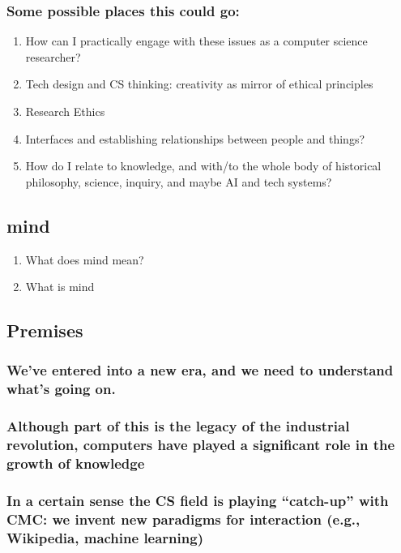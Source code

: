 \documentclass[11pt]{article}
\begin{document}
\subsubsection{Some possible places this could go:}
\label{sec:org56ebe9a}
\begin{enumerate}
\item How can I practically engage with these issues as a computer science researcher?
\label{sec:orgc471b6f}
\item Tech design and CS thinking: creativity as mirror of ethical principles
\label{sec:org09ec082}
\item Research Ethics
\label{sec:org282b2fa}
\item Interfaces and establishing relationships between people and things?
\label{sec:orgbc927ef}
\item How do I relate to knowledge, and with/to the whole body of historical philosophy, science, inquiry, and maybe AI and tech systems?
\label{sec:orgf91d822}
\end{enumerate}
\subsection{mind}
\label{sec:orge4b262a}

\begin{enumerate}
\item What does mind mean?
\label{sec:org4c9b9ca}
\item What is mind
\label{sec:org8d5cc07}
\end{enumerate}
\subsection{Premises}
\label{sec:org84f8193}

\subsubsection{We’ve entered into a new era, and we need to understand what’s going on.}
\label{sec:org0c9e273}
\subsubsection{Although part of this is the legacy of the industrial revolution, computers have played a significant role in the growth of knowledge}
\label{sec:org844a366}
\subsubsection{In a certain sense the CS field is playing “catch-up” with CMC: we invent new paradigms for interaction (e.g., Wikipedia, machine learning)}
\label{sec:org36ddcd9}
\end{document}
